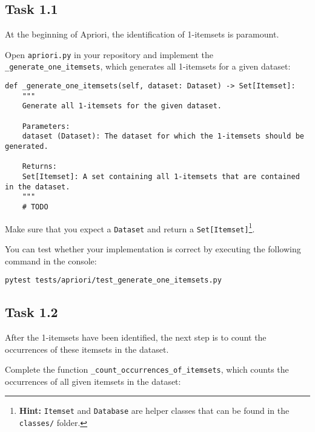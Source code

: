 \documentclass[
english,
smallborders
]{i6prcsht}
\begin{document}
\subsection*{Task 1.1}

At the beginning of Apriori, the identification of 1-itemsets is paramount.

Open \texttt{apriori.py} in your repository and implement the \texttt{\_generate\_one\_itemsets}, which generates all 1-itemsets for a given dataset:

\vspace*{0.3cm}

\begin{lstlisting}
def _generate_one_itemsets(self, dataset: Dataset) -> Set[Itemset]:
	"""
	Generate all 1-itemsets for the given dataset.

	Parameters:
	dataset (Dataset): The dataset for which the 1-itemsets should be generated.

	Returns:
	Set[Itemset]: A set containing all 1-itemsets that are contained in the dataset.
	"""
	# TODO
\end{lstlisting}

\vspace*{0.1cm}

Make sure that you expect a \texttt{Dataset} and return a \texttt{Set[Itemset]}\footnote{\textbf{Hint:} \texttt{Itemset} and \texttt{Database} are helper classes that can be found in the \texttt{classes/} folder.}.

You can test whether your implementation is correct by executing the following command in the console:

\vspace*{0.3cm}

\begin{lstlisting}
pytest tests/apriori/test_generate_one_itemsets.py
\end{lstlisting}

\vspace*{0.1cm}

\subsection*{Task 1.2}

After the 1-itemsets have been identified, the next step is to count the occurrences of these itemsets in the dataset.

Complete the function \texttt{\_count\_occurrences\_of\_itemsets}, which counts the occurrences of all given itemsets in the dataset:
\end{document}
